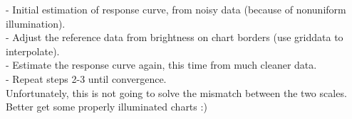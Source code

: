 - Initial estimation of response curve, from noisy data (because of nonuniform illumination).\\
- Adjust the reference data from brightness on chart borders (use griddata to interpolate).\\
- Estimate the response curve again, this time from much cleaner data.\\
- Repeat steps 2-3 until convergence.\\ 

Unfortunately, this is not going to solve the mismatch between the two scales. Better get some properly illuminated charts :) 

